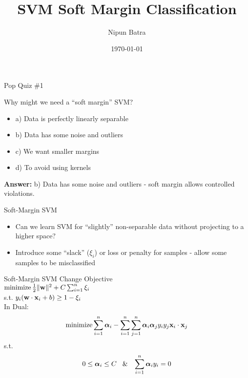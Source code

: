 \documentclass{beamer}
\title{SVM Soft Margin Classification}
\date{\today}
\author{Nipun Batra}
\institute{IIT Gandhinagar}
\begin{document}
	\maketitle
	
{
	
}

	
	\begin{frame}{Pop Quiz \#1}
	\begin{tcolorbox}[colback=blue!5!white,colframe=blue!75!black,title=Quick Question!]
	Why might we need a ``soft margin'' SVM?
	\begin{itemize}
		\item a) Data is perfectly linearly separable
		\item b) Data has some noise and outliers
		\item c) We want smaller margins
		\item d) To avoid using kernels
	\end{itemize}
	\pause
	\textbf{Answer:} b) Data has some noise and outliers - soft margin allows controlled violations.
	\end{tcolorbox}
	\end{frame}

	\begin{frame}{Soft-Margin SVM}
	\begin{itemize}[<+->]
		\item Can we learn SVM for ``slightly'' non-separable data without projecting to a higher space? 
		\item Introduce some ``slack'' ($\xi_i$) or loss or penalty for samples - allow some samples to be misclassified
		
	\end{itemize}
		
		
		
	\end{frame}

{
	
}
	
	\begin{frame}{Soft-Margin SVM}
		Change Objective \\
		\vspace{0.1cm}
		$\operatorname{minimize} \frac{1}{2}\|\mathbf{w}\|^{2} + C \sum_{i=1}^{n}\xi_{i}$ \\ s.t. $y_{i}(\mathbf{w} \cdot \mathbf{x}_i + b) \geq 1 - \xi_{i}$ \\
		
		\vspace{0.2cm}
		\pause In Dual:
		$$\operatorname{minimize} \sum_{i=1}^{n}\boldsymbol{\alpha}_{i} - \sum_{i=1}^{n}\sum_{j=1}^{n}\boldsymbol{\alpha}_{i}\boldsymbol{\alpha}_{j}y_{i}y_{j}\mathbf{x}_{i} \cdot \mathbf{x}_{j}$$
		s.t.
		$$0 \leq \boldsymbol{\alpha}_{i} \leq C \text{\hspace{0.3cm}\&\hspace{0.3cm}} \sum_{i=1}^{n}\boldsymbol{\alpha}_{i}y_{i} = 0$$
		
	\end{frame}
\end{document}
